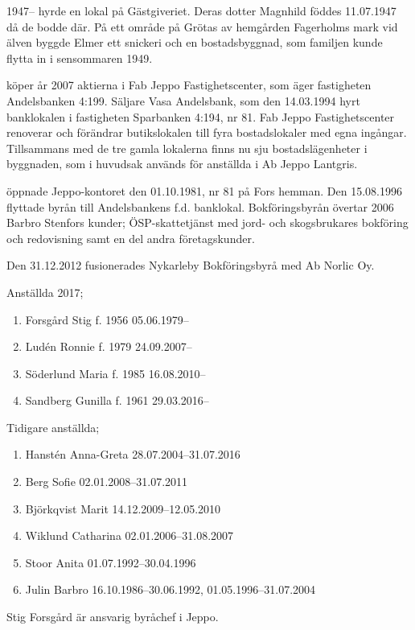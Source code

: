 1947-- hyrde  en lokal på Gästgiveriet. Deras dotter Magnhild föddes 11.07.1947 då de bodde där.	På ett område på Grötas av hemgården Fagerholms mark vid älven 	byggde Elmer ett snickeri och en bostadsbyggnad, som familjen kunde flytta in i sensommaren 1949.





 köper år 2007 aktierna i Fab Jeppo Fastighetscenter, som äger fastigheten Andelsbanken 4:199.	Säljare Vasa Andelsbank, som den 14.03.1994 hyrt banklokalen i fastigheten Sparbanken 4:194, nr 81. Fab Jeppo Fastighetscenter renoverar och förändrar butikslokalen till fyra bostadslokaler med egna ingångar. Tillsammans med de tre gamla lokalerna finns nu sju bostadslägenheter i byggnaden, som i huvudsak används för anställda i Ab Jeppo Lantgris.



 öppnade Jeppo-kontoret den 01.10.1981, nr 81 på Fors hemman. Den 15.08.1996 flyttade byrån till Andelsbankens f.d. banklokal. Bokföringsbyrån övertar 2006 Barbro Stenfors kunder; ÖSP-skattetjänst med jord- och skogsbrukares bokföring och redovisning samt en del andra företagskunder.

Den 31.12.2012 fusionerades Nykarleby Bokföringsbyrå med Ab Norlic Oy.

Anställda 2017;
\begin{enumerate}
  \item Forsgård Stig     f. 1956   05.06.1979--
  \item Ludén Ronnie      f. 1979	  24.09.2007--
  \item Söderlund Maria   f. 1985	  16.08.2010--
  \item Sandberg Gunilla  f. 1961	  29.03.2016--
\end{enumerate}

Tidigare anställda;
\begin{enumerate}
  \item Hanstén Anna-Greta    28.07.2004--31.07.2016
  \item Berg Sofie            02.01.2008--31.07.2011
  \item Björkqvist Marit      14.12.2009--12.05.2010
  \item Wiklund Catharina     02.01.2006--31.08.2007
  \item Stoor Anita           01.07.1992--30.04.1996
  \item Julin Barbro          16.10.1986--30.06.1992, 01.05.1996--31.07.2004
\end{enumerate}
Stig Forsgård är ansvarig byråchef i Jeppo.


